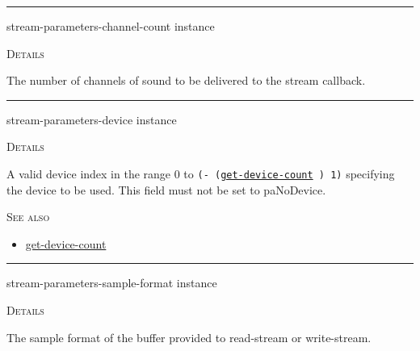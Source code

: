 \documentclass[a4paper]{report}
\begin{document}
  

    \rule{\linewidth}{0.1mm}
    
    \label{portaudio__fun__stream-parameters-channel-count}
    \begin{defun}[Function]
    stream-parameters-channel-count instance


	
    \bigskip
    \textsc{Details}

The number of channels of sound to be delivered to the stream callback.


    
    \end{defun}
  
  

    \rule{\linewidth}{0.1mm}
    
    \label{portaudio__fun__stream-parameters-device}
    \begin{defun}[Function]
    stream-parameters-device instance


	
    \bigskip
    \textsc{Details}

A valid device index in the range 0 to \texttt{(- (\hyperref[portaudio__fun__get-device-count]{\texttt{get-device-count}}
  ) 1)} specifying the device to be used. This field must not be set to paNoDevice.


      
    \bigskip
    \textsc{See also}


	
    \begin{itemize}
    
	  
    \item
    \hyperref[portaudio__fun__get-device-count]{get-device-count}
    
	
    \end{itemize}
  
      


    
    \end{defun}
  
  

    \rule{\linewidth}{0.1mm}
    
    \label{portaudio__fun__stream-parameters-sample-format}
    \begin{defun}[Function]
    stream-parameters-sample-format instance


	
    \bigskip
    \textsc{Details}

The sample format of the buffer provided to read-stream or write-stream.


    
    \end{defun}
  
\end{document}
